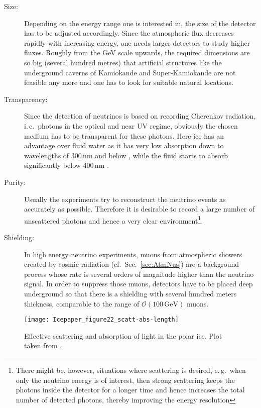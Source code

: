 \begin{description}
 \item[Size:] Depending on the energy range one is interested in, the size of
  the detector has to be adjusted accordingly. Since the atmospheric flux
  decreases rapidly with increasing energy, one needs larger detectors to study
  higher fluxes. Roughly from the GeV scale upwards, the required dimensions are
  so big (several hundred metres) that artificial structures like the
  underground caverns of Kamiokande and Super-Kamiokande \cite{SuperKosc} are
  not feasible any more and one has to look for suitable natural locations.
 \item[Transparency:] Since the detection of neutrinos is based on recording
  Cherenkov radiation, i.\,e.\ photons in the optical and near UV regime,
  obviously the chosen medium has to be transparent for these photons. Here ice
  has an advantage over fluid water as it has very low absorption down to
  wavelengths of 300\,nm and below \cite{IceProps}, while the fluid starts to
  absorb significantly below 400\,nm \cite{WaterAbs}.
 \item[Purity:] Usually the experiments try to reconstruct the neutrino events
  as accurately as possible. Therefore it is desirable to record a large number
  of unscattered photons and hence a very clear environment\footnote{There might
  be, however, situations where scattering is desired, e.\,g.\ when only the
  neutrino energy is of interest, then strong scattering keeps the photons
  inside the detector for a longer time and hence increases the total number
  of detected photons, thereby improving the energy resolution}.
 \item[Shielding:] In high energy neutrino experiments, muons from atmospheric
  showers created by cosmic radiation (cf.\ Sec.~\ref{sec:AtmNus}) are a
  background process whose rate is several orders of magnitude higher than the
  neutrino signal. In order to suppress those muons, detectors have to be
  placed deep underground so that there is a shielding with several hundred
  meters thickness, comparable to the range of $\mathcal{O}
  (100\,\mathrm{GeV})$ muons.
\end{description}

\begin{figure}[htp]
 \centering
 \texttt{[image: Icepaper\_figure22\_scatt-abs-length]}
 \caption{Effective scattering and absorption of light in the polar ice. Plot 
  taken from \cite{IceProps}.}
 \label{fig:ice_scatt_abs}
\end{figure}

